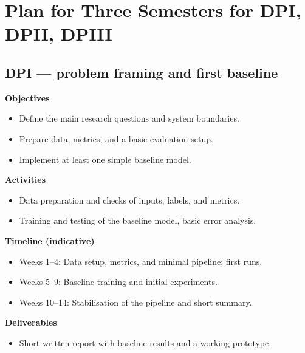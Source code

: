 \documentclass[12pt,a4paper]{report}
\begin{document}
\section{Plan for Three Semesters for DPI, DPII, DPIII} 

\subsection*{DPI — problem framing and first baseline}
\textbf{Objectives}
\begin{itemize}
  \item Define the main research questions and system boundaries.
  \item Prepare data, metrics, and a basic evaluation setup.
  \item Implement at least one simple baseline model.
\end{itemize}
\textbf{Activities}
\begin{itemize}
  \item Data preparation and checks of inputs, labels, and metrics.
  \item Training and testing of the baseline model, basic error analysis.
\end{itemize}
\textbf{Timeline (indicative)}
\begin{itemize}
  \item Weeks 1--4: Data setup, metrics, and minimal pipeline; first runs.
  \item Weeks 5--9: Baseline training and initial experiments.
  \item Weeks 10--14: Stabilisation of the pipeline and short summary.
\end{itemize}
\textbf{Deliverables}
\begin{itemize}
  \item Short written report with baseline results and a working prototype.
\end{itemize}
\end{document}
